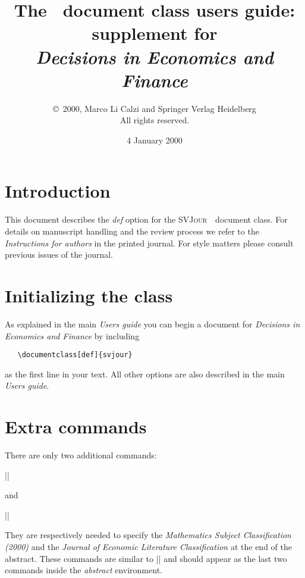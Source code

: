 \documentclass[draft]{ltxguide}[1995/11/28]
\title{The \SJour\ document class users
guide:\\supplement for\\\textit{Decisions in Economics and Finance}}
\author{\copyright~2000, Marco Li Calzi and Springer
Verlag Heidelberg\\  All rights reserved.}
\date{4 January 2000}
\newcommand{\SJour}{\textsc{SVJour}}
\begin{document}
\maketitle

\section{Introduction}\label{sec:intro}

This document describes the \textit{def} option for the \SJour\ \LaTeXe\
document class. For details on manuscript handling and the review process
we refer to the \emph{Instructions for authors} in the printed journal.
For style matters please consult previous issues of the journal.

\section{Initializing the class}\label{sec:opt}

As explained in the main \emph{Users guide} you can begin a document for
\emph{Decisions in Economics and Finance} by including
\begin{verbatim}
   \documentclass[def]{svjour}
\end{verbatim}
as the first line in your text. All other options are also described
in the main \emph{Users guide}.

\section{Extra commands}

There are only two additional commands:
\begin{decl}
|\subclassMath|
\end{decl}
and
\begin{decl}
|\subclassEcon|
\end{decl}

They are respectively needed to specify the \emph{Mathematics Subject
Classification (2000)} and  the \emph{Journal of Economic Literature
Classification} at the end of the abstract. These commands are similar to
|\keywords| and should appear as the last two commands inside the
\emph{abstract} environment.
\end{document}
